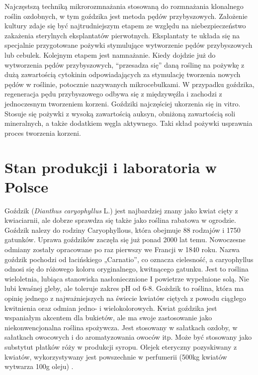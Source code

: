 \documentclass[two column, twoside, a4paper]{article}
\begin{document}
Najczęstszą techniką mikrorozmnażania stosowaną do rozmnażania klonalnego roślin ozdobnych, w tym goździka jest metoda pędów przybyszowych. Założenie kultury zdaje się być najtrudniejszym etapem ze względu na niebezpieczeństwo zakażenia sterylnych eksplantatów pierwotnych. Eksplantaty te układa się na specjalnie przygotowane pożywki stymulujące wytworzenie pędów przybyszowych lub cebulek. Kolejnym etapem jest namnażanie. Kiedy dojdzie już do wytworzenia pędów przybyszowych, “przesadza się” daną roślinę na pożywkę z dużą zawartością cytokinin odpowiadających za stymulację tworzenia nowych pędów w roślinie, potocznie nazywanych mikrocebulkami. W przypadku goździka, regeneracja pędu przybyszowego odbywa się z międzywęźla i zachodzi z jednoczesnym tworzeniem korzeni.  Goździki najczęściej ukorzenia się in vitro. Stosuje się pożywki z wysoką zawartością auksyn, obniżoną zawartością soli mineralnych, a także dodatkiem węgla aktywnego. Taki skład pożywki usprawnia proces tworzenia korzeni.

\section{Stan produkcji i laboratoria w Polsce}


Goździk (\textit{Dianthus caryophyllus} L.) jest najbardziej znany jako kwiat cięty
z kwiaciarnii, ale  dobrze sprawdza się także jako roślina rabatowa w ogrodzie. Goździk nalezy do rodziny Caryophyllous, która obejmuje  88 rodzajów i 1750 gatunków. Uprawa goździków zaczęła się już ponad 2000 lat temu. Nowoczesne odmiany zostały opracowane po raz pierwszy we Francji w 1840 roku. Nazwa goździk pochodzi od łacińskiego „Carnatio”, co oznacza cielesność, a caryophyllus odnosi się do różowego koloru oryginalnego, kwitnącego gatunku. Jest to roślina wieloletnia, lubiąca stanowiska nasłoniecznione I powietrze wypełnione solą. Nie lubi kwaśnej gleby, ale toleruje zakres pH od 6-8. Gożdzik to roślina, która ma opinię jednego z najważniejszych na świecie kwiatów ciętych z powodu ciągłego kwitnienia  oraz odmian jedno- i wielokolorowych.
Kwiat goździka jest wspaniałym akcentem dla bukietów, ale ma swoje zastosowanie  jako niekonwencjonalna roślina spożywcza. Jest stosowany w sałatkach ozdoby,
w sałatkach owocowych i do aromatyzowania owoców itp. Może być stosowany jako substytut płatków róży w produkcji syropu. Olejek eteryczny pozyskiwany  z kwiatów, wykorzystywany jest powszechnie w perfumerii (500kg kwiatów wytwarza 100g oleju) .
\end{document}

